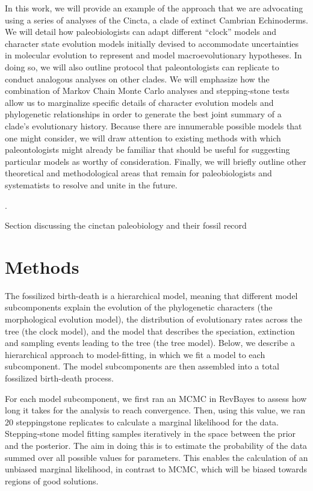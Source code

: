 \documentclass{article}
\begin{document}
In this work, we will provide an example of the approach that we are advocating using a series of analyses of the Cincta, a clade of extinct Cambrian Echinoderms. We will detail how paleobiologists can adapt different “clock” models and character state evolution models initially devised to accommodate uncertainties in molecular evolution to represent and model macroevolutionary hypotheses.  In doing so, we will also outline protocol that paleontologists can replicate to conduct analogous analyses on other clades.  We will emphasize how the combination of Markov Chain Monte Carlo analyses and stepping‑stone tests allow us to marginalize specific details of character evolution models and phylogenetic relationships in order to generate the best joint summary of a clade’s evolutionary history.  Because there are innumerable possible models that one might consider, we will draw attention to existing methods with which paleontologists might already be familiar that should be useful for suggesting particular models as worthy of consideration.  Finally, we will briefly outline other theoretical and methodological areas that remain for paleobiologists and systematists to resolve and unite in the future. 

.  



Section discussing the cinctan paleobiology and their fossil record

\section{Methods}

The fossilized birth-death is a hierarchical model, meaning that different model subcomponents explain the evolution of the phylogenetic characters (the morphological evolution model), the distribution of evolutionary rates across the tree (the clock model), and the model that describes the speciation, extinction and sampling events leading to the tree (the tree model). 
Below, we describe a hierarchical approach to model-fitting, in which we fit a model to each subcomponent.
The model subcomponents are then assembled into a total fossilized birth-death process.

For each model subcomponent, we first ran an MCMC in RevBayes to assess how long it takes for the analysis to reach convergence. 
Then, using this value, we ran 20 steppingstone replicates to calculate a marginal likelihood for the data.
Stepping-stone model fitting samples iteratively in the space between the prior and the posterior.
The aim in doing this is to estimate the probability of the data summed over all possible values for parameters. 
This enables the calculation of an unbiased marginal likelihood, in contrast to MCMC, which will be biased towards regions of good solutions. 
\end{document}
